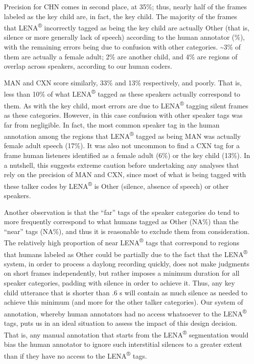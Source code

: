 \documentclass[english,table,man,floatsintext]{apa6}
\begin{document}
Precision for CHN comes in second place, at 35\%; thus, nearly half of the frames labeled as the key child are, in fact, the key child. The majority of the frames that LENA\textsuperscript{®} incorrectly tagged as being the key child are actually Other (that is, silence or more generally lack of speech) according to the human annotator (\%), with the remaining errors being due to confusion with other categories. \textasciitilde{}3\% of them are actually a female adult; 2\% are another child, and 4\% are regions of overlap across speakers, according to our human coders.

MAN and CXN score similarly, 33\% and 13\% respectively, and poorly. That is, less than 10\% of what LENA\textsuperscript{®} tagged as these speakers actually correspond to them. As with the key child, most errors are due to LENA\textsuperscript{®} tagging silent frames as these categories. However, in this case confusion with other speaker tags was far from negligible. In fact, the most common speaker tag in the human annotation among the regions that LENA\textsuperscript{®} tagged as being MAN was actually female adult speech (17\%). It was also not uncommon to find a CXN tag for a frame human listeners identified as a female adult (6\%) or the key child (13\%). In a nutshell, this suggests extreme caution before undertaking any analyses that rely on the precision of MAN and CXN, since most of what is being tagged with these talker codes by LENA\textsuperscript{®} is Other (silence, absence of speech) or other speakers.

Another observation is that the \enquote{far} tags of the speaker categories do tend to more frequently correspond to what humans tagged as Other (NA\%) than the \enquote{near} tags (NA\%), and thus it is reasonable to exclude them from consideration. The relatively high proportion of near LENA\textsuperscript{®} tags that correspond to regions that humans labeled as Other could be partially due to the fact that the LENA\textsuperscript{®} system, in order to process a daylong recording quickly, does not make judgments on short frames independently, but rather imposes a minimum duration for all speaker categories, padding with silence in order to achieve it. Thus, any key child utterance that is shorter than .6 s will contain as much silence as needed to achieve this minimum (and more for the other talker categories). Our system of annotation, whereby human annotators had no access whatsoever to the LENA\textsuperscript{®} tags, puts us in an ideal situation to assess the impact of this design decision. That is, any manual annotation that starts from the LENA\textsuperscript{®} segmentation would bias the human annotator to ignore such interstitial silences to a greater extent than if they have no access to the LENA\textsuperscript{®} tags.
\end{document}
